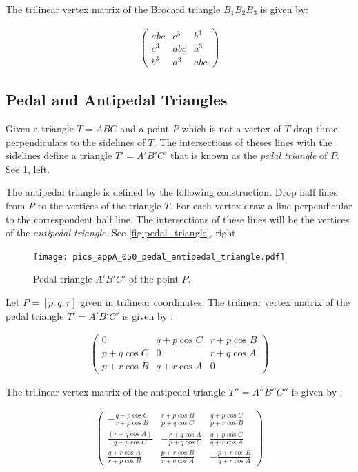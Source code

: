 The trilinear vertex matrix of the Brocard triangle $B_1B_2B_3$ is given by:

\begin{align*}
   \left(\begin{matrix} abc& c^3& b^3\\
   c^3&abc & a^3\\
   b^3 &a^3 &abc\end{matrix}\right)
\end{align*}

\subsection{Pedal and Antipedal Triangles}

Given a triangle $T=ABC$  and a point $P$ which is not a vertex of $T$ drop three perpendiculars to the sidelines of $T$. The intersections of theses lines with the sidelines define a triangle $T'=A'B'C'$ that is known as the {\em pedal triangle} of $P$. See \cref{fig:appA-pedal_triangle}, left.

The antipedal triangle is defined by the following construction.
Drop half lines from $P$ to the vertices of the triangle $T$. For each vertex draw a line perpendicular to the correspondent half  line. The intersections of these  lines will be the vertices of the {\em antipedal triangle}. See \cref{fig:pedal_triangle}, right.
 \begin{figure}[H]
      \texttt{[image: pics\_appA\_050\_pedal\_antipedal\_triangle.pdf]}
    \caption{Pedal triangle $A'B'C'$ of the point $P$.}
    \label{fig:appA-pedal_triangle}
\end{figure}

Let $P=[p:q:r]$ given in trilinear coordinates. The trilinear vertex matrix of the pedal triangle $T'=A'B'C'$ is given by \cite{mw}:

\begin{align*}
   \left(\begin{matrix} 0& q+p\cos C& r+p\cos B\\
   p+q\cos C &0 & r+q\cos A\\
   p+r\cos B & q+r\cos A &0\end{matrix}\right)
\end{align*}


The trilinear vertex matrix of the antipedal triangle $T''=A''B''C''$ is given by \cite{mw}:
 
\begin{align*}
   \left(\begin{matrix} - \frac{ q + p \cos C}{r + p \cos B}& \frac{r + p \cos B}{p + q \cos C}& \frac{q + p \cos C}{p + r \cos B}\\
    \frac{ (r + q \cos A)}{q + p \cos C}& -\frac{r + q \cos A}{p + q \cos  C}& \frac{q + p \cos C}{q + r \cos A}\\
   \frac{q + r \cos A}{r + p \cos B}&\frac{ p + r \cos B}{r + q \cos A} & - \frac{p + r \cos B}{q + r \cos A}\end{matrix}\right)
\end{align*}

